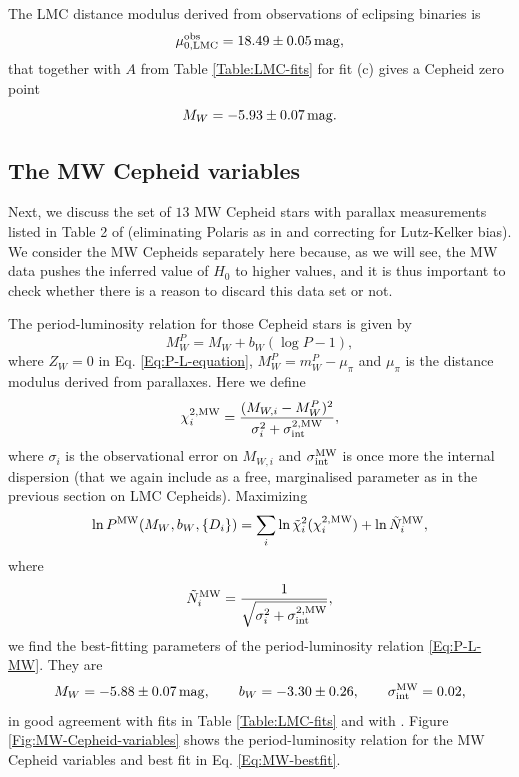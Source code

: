 The LMC distance modulus derived from observations of eclipsing binaries \cite{Pietrzynski:2013gia} is 
\begin{equation}
\mu_{0,\mathrm{LMC}}^{\mathrm{obs}} = 18.49 \pm 0.05\, \mathrm{mag},
\label{Eq:LMC-measured-distance-modulus}
\end{equation}
that together with $A$ from Table \ref{Table:LMC-fits} for fit (c) gives a Cepheid zero point
\begin{equation}\label{Eq:zero-point-LMC}
M_W = -5.93 \pm 0.07\, \mathrm{mag}.
\end{equation}


\subsection{The MW Cepheid variables}
\label{Subsection:MW-1}

Next, we discuss the set of $13$ MW Cepheid stars with parallax measurements listed in Table 2 of \cite{vanLeeuwen:2007xw} (eliminating Polaris as in \cite{Efstathiou:2013via} and correcting for Lutz-Kelker bias). We consider the MW Cepheids separately here because, as we will see, the MW data pushes the inferred value of $H_0$ to higher values, and it is thus important to check whether there is a reason to discard this data set or not.

The period-luminosity relation for those Cepheid stars is given by
\begin{equation}\label{Eq:P-L-MW}
M^P_W = M_W + b_W (\log P - 1),
\end{equation}
where $Z_W=0$ in Eq. \eqref{Eq:P-L-equation}, $M^P_W = m^P_W - \mu_{\pi}$ and $\mu_\pi$ is the distance modulus derived from parallaxes. Here we define 
\begin{equation}\label{Eq:chi2-MW}
\chi^{2,\mathrm{MW}}_{i} = \frac{(M_{W,i} - M^P_{W})^2}{\sigma_i^2 + \sigma^{2,\mathrm{MW}}_{\mathrm{int}}},
\end{equation}
where $\sigma_i$ is the observational error on $M_{W,i}$ and $\sigma_{\mathrm{int}}^{\mathrm{MW}}$ is once more the internal dispersion (that we again include as a free, marginalised parameter as in the previous section on LMC Cepheids). Maximizing  
\begin{equation}
\label{Eq:likelihood-HP-MW}
\ln P^{\mathrm{MW}}(M_W,b_W,\lbrace D_i \rbrace) = \sum_{i} \ln \tilde{\chi}_i^{2}(\chi^{2,\mathrm{MW}}_{i}) + \ln \tilde{N}^{\mathrm{MW}}_{i},
\end{equation}
where 
\begin{equation}
\label{Eq:normalization-MW}
\tilde{N}^{\mathrm{MW}}_i = \frac{1}{\sqrt{\sigma_i^2 +\sigma^{2,\mathrm{MW}}_{\mathrm{int}}}},
\end{equation}
we find the best-fitting parameters of the period-luminosity relation \eqref{Eq:P-L-MW}. They are 
\begin{equation}\label{Eq:MW-bestfit}
M_W = -5.88 \pm 0.07\,\mathrm{mag}  , \qquad b_W = -3.30 \pm 0.26  , \qquad \sigma_{\mathrm{int}}^{\mathrm{MW}} = 0.02 ,
\end{equation}
in good agreement with fits in Table \ref{Table:LMC-fits} and with \cite{Efstathiou:2013via}. 
Figure \ref{Fig:MW-Cepheid-variables} shows the period-luminosity relation for the MW Cepheid variables and best fit in Eq. \eqref{Eq:MW-bestfit}.

